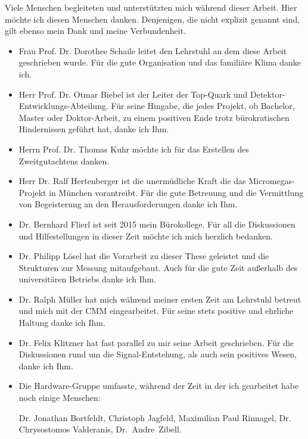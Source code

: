 \documentclass[
twoside,            %
BCOR1.4cm,          %
10pt,               %
headings=normal,    %
headsepline,        %
clearplainpage,		%
final,              %
div=14,
open=right,
bibliography=toc
]{scrreprt}
\begin{document}
{}

\newpage


Viele Menschen begleiteten und unterst\"utzten mich w\"ahrend dieser Arbeit.
Hier m\"ochte ich diesen Menschen danken.
Denjenigen, die nicht explizit genannt sind, gilt ebenso mein Dank und meine Verbundenheit. 

\begin{itemize}
	\item
		Frau Prof. Dr. Dorothee Schaile leitet den Lehrstuhl an dem diese Arbeit geschrieben wurde.
		F\"ur die gute Organisation und das famili\"are Klima danke ich.
	\item
		Herr Prof. Dr. Otmar Biebel ist der Leiter der Top-Quark und Detektor-Entwicklungs-Abteilung.
		F\"ur seine Hingabe, die jedes Projekt, ob Bachelor, Master oder Doktor-Arbeit, zu einem positiven Ende trotz b\"urokratischen Hindernissen gef\"uhrt hat, danke ich Ihm.
	\item
		Herrn Prof. Dr. Thomas Kuhr m\"ochte ich f\"ur das Erstellen des Zweitgutachtens danken.
	\item
		Herr Dr. Ralf Hertenberger ist die unerm\"udliche Kraft die das Micromegas-Projekt in M\"unchen vorantreibt.
		F\"ur die gute Betreuung und die Vermittlung von Begeisterung an den Herausforderungen danke ich Ihm.
	\item
		Dr. Bernhard Flierl ist seit 2015 mein B\"urokollege.
		F\"ur all die Diskussionen und Hilfestellungen in dieser Zeit m\"ochte ich mich herzlich bedanken.
	\item
		Dr. Philipp L\"osel hat die Vorarbeit zu dieser These geleistet und die Strukturen zur Messung mitaufgebaut.
		Auch f\"ur die gute Zeit au\ss erhalb des universit\"aren Betriebs danke ich Ihm.
	\item
		Dr. Ralph M\"uller hat mich w\"ahrend meiner ersten Zeit am Lehrstuhl betreut und mich mit der CMM eingearbeitet.
		F\"ur seine stets positive und ehrliche Haltung danke ich Ihm.
	\item
		Dr. Felix Klitzner hat fast parallel zu mir seine Arbeit geschrieben.
		F\"ur die Diskussionen rund um die Signal-Entstehung, als auch sein positives Wesen, danke ich Ihm.
	\item
		Die Hardware-Gruppe umfasste, w\"ahrend der Zeit in der ich gearbeitet habe noch einige Menschen: 
		
		Dr. Jonathan Bortfeldt, Christoph Jagfeld, Maximilian Paul Rinnagel, Dr. Chrysostomos Valderanis, \mbox{Dr. Andre Zibell}.
		

\end{itemize}
\end{document}
